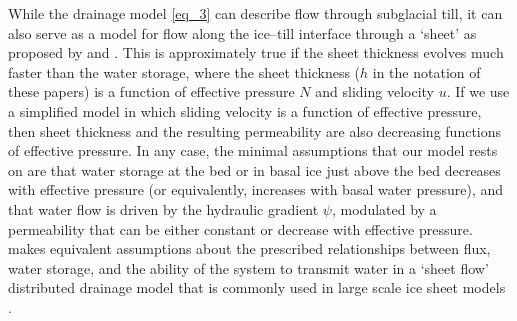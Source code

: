 \documentclass[journal abbreviation, manuscript]{copernicus}
\begin{document}
While the drainage model \eqref{eq_3} can describe flow through subglacial till, it can also serve as a model 
for flow along the ice--till interface through a `sheet' as proposed by \citet{schoof2012flotation} and \citet{hewitt2012flotation}. This is approximately true if the sheet thickness evolves much faster than the water storage, where the 
sheet thickness ($h$ in the notation of these papers) is a function of 
effective pressure $N$ and sliding velocity $u$. If we use a simplified 
model in which sliding velocity is a function of effective pressure, then
sheet thickness and the resulting permeability are also decreasing 
functions of effective pressure. In any case, the minimal 
assumptions that our model rests on are that water storage at the bed or 
in basal ice just above the bed \citep{werder2013modeling, schoof2014oscillatory}
decreases with effective pressure (or equivalently, increases with basal 
water pressure), and that water flow is driven by the hydraulic gradient 
$\psi$, modulated by a permeability that can be either constant or 
decrease with effective pressure.
\citet{alley1996towards} makes equivalent assumptions about the prescribed relationships between flux, water storage, and the ability of the system to transmit water in a `sheet flow' distributed drainage model that is commonly used in large scale ice sheet models \citep{flowers2015modelling}. 
\end{document}
